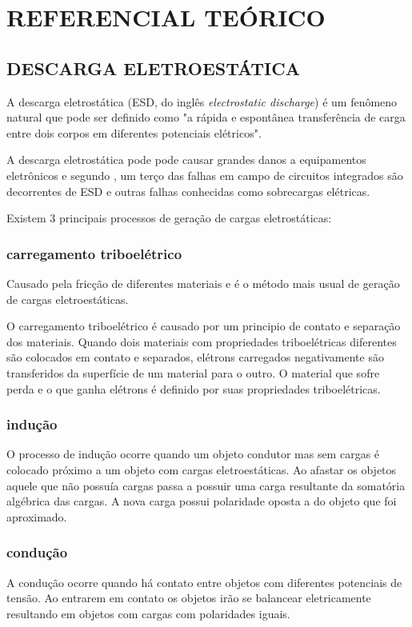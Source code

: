 \documentclass[
	12pt,				%
	openright,			%
	oneside,			%
	a4paper,			%
	chapter=TITLE,		%
	english,			%
	french,				%
	spanish,			%
	brazil,				%
	article,			%
	]{uea-abntex2}
\begin{document}
\section{REFERENCIAL TEÓRICO}

\subsection{DESCARGA ELETROESTÁTICA}
A descarga eletrostática (ESD, do inglês \textit{electrostatic
discharge}) é um fenômeno natural que pode ser definido como "a rápida e espontânea transferência de carga entre dois corpos em diferentes potenciais elétricos".\cite{esda}

A descarga eletrostática pode pode causar grandes danos a equipamentos eletrônicos \cite{Katsivelis2010} e segundo \citeauthor{Hwang2005}, um terço das falhas em campo de circuitos integrados são decorrentes de ESD e outras falhas conhecidas como sobrecargas elétricas.

Existem 3 principais processos de geração de cargas eletrostáticas:
\subsubsection{carregamento triboelétrico}
Causado pela fricção de diferentes materiais e é o método mais usual de geração de cargas eletroestáticas.

O carregamento triboelétrico é causado por um principio de contato e separação dos materiais. Quando dois materiais com propriedades triboelétricas diferentes são colocados em contato e separados, elétrons carregados negativamente são transferidos da superfície de um material para o outro. O material que sofre perda e o que ganha elétrons é definido por suas propriedades triboelétricas\cite{Hwang2005}. 

\subsubsection{indução}
O processo de indução ocorre quando um objeto condutor mas sem cargas é colocado próximo a um objeto com cargas eletroestáticas. Ao afastar os objetos aquele que não possuía cargas passa a possuir uma carga resultante da somatória algébrica das cargas. A nova carga possui polaridade oposta a do objeto que foi aproximado.
\subsubsection{condução} 
A condução ocorre quando há contato entre objetos com diferentes potenciais de tensão. Ao entrarem em contato os objetos irão se balancear eletricamente resultando em objetos com cargas com polaridades iguais.
\end{document}
